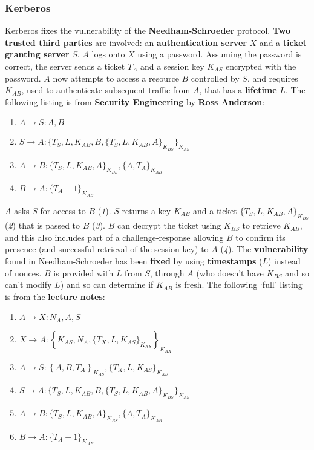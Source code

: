\documentclass[final]{article}
\begin{document}
\subsubsection{Kerberos}
Kerberos fixes the vulnerability of the \textbf{Needham-Schroeder} protocol. \textbf{Two trusted third parties} are involved: an \textbf{authentication server} $ X $ and a \textbf{ticket granting server} $ S $. $ A $ logs onto $ X $ using a password. Assuming the password is correct, the server sends a ticket $ T_{A} $ and a session key $ K_{AS} $ encrypted with the password. $ A $ now attempts to access a resource $ B $ controlled by $ S $, and requires $ K_{AB} $, used to authenticate subsequent traffic from $ A $, that has a \textbf{lifetime} $ L $. The following listing is from \textbf{Security Engineering} by \textbf{Ross Anderson}:
\begin{enumerate}
	\item $ A \rightarrow S : A, B $
	\item $ S \rightarrow A : \{ T_{S}, L, K_{AB}, B, \{ T_{S}, L, K_{AB}, A \}_{K_{BS}} \}_{K_{AS}} $
	\item $ A \rightarrow B : \{ T_{S}, L, K_{AB}, A \}_{K_{BS}}, \{ A, T_{A} \}_{K_{AB}} $
	\item $ B \rightarrow A : \{ T_{A} + 1 \}_{K_{AB}} $
\end{enumerate}
$ A $ asks $ S $ for access to $ B $ (\textit{1}). $ S $ returns  a key $ K_{AB} $ and a ticket $ \{ T_{S}, L, K_{AB}, A \}_{K_{BS}} $ (\textit{2}) that is passed to $ B $ (\textit{3}). $ B $ can decrypt the ticket using $ K_{BS} $ to retrieve $ K_{AB} $, and this also includes part of a challenge-response allowing $ B $ to confirm its presence (and successful retrieval of the session key) to $ A $ (\textit{4}). The \textbf{vulnerability} found in Needham-Schroeder has been \textbf{fixed} by using \textbf{timestamps} ($ L $) instead of nonces. $ B $ is provided with $ L $ from $ S $, through $ A $ (who doesn't have $ K_{BS} $ and so can't modify $ L $) and so can determine if $ K_{AB} $ is fresh. The following `full' listing is from the \textbf{lecture notes}:
\begin{enumerate}
	\item $ A \rightarrow X : N_{A}, A, S $
	\item $ X \rightarrow A : \left\lbrace K_{AS}, N_{A}, \{ T_{X}, L, K_{AS} \}_{K_{XS}} \right\rbrace_{K_{AX}} $
	\item $ A \rightarrow S : \left\lbrace A, B, T_{A} \right\rbrace_{K_{AS}}, \{ T_{X}, L, K_{AS} \}_{K_{XS}} $
	\item $ S \rightarrow A : \{ T_{S}, L, K_{AB}, B, \{ T_{S}, L, K_{AB}, A \}_{K_{BS}} \}_{K_{AS}} $
	\item $ A \rightarrow B : \{ T_{S}, L, K_{AB}, A \}_{K_{BS}}, \{ A, T_{A} \}_{K_{AB}} $
	\item $ B \rightarrow A : \{ T_{A} + 1 \}_{K_{AB}} $
\end{enumerate}
\end{document}
